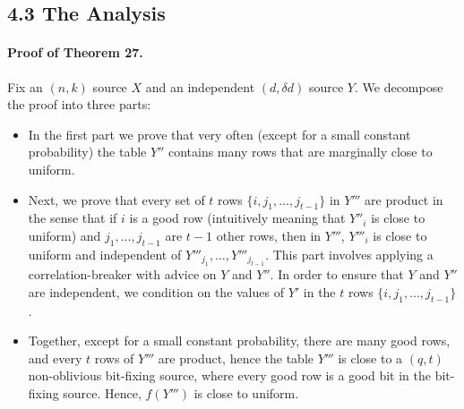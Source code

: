 \subsection*{4.3 The Analysis}
\paragraph{Proof of Theorem 27.} Fix an $(n,k)$ source $X$ and an independent $(d,\delta d)$ source $Y$. We decompose the proof into three parts:
\begin{itemize}
\item In the first part we prove that very often (except for a small constant probability) the table $Y''$ contains many rows that are marginally close to uniform.
\item Next, we prove that every set of $t$ rows $\{i,j_1,\ldots,j_{t-1}\}$ in $Y'''$ are product in the sense that if $i$ is a good row (intuitively meaning that $Y''_i$ is close to uniform) and $j_1,\ldots,j_{t-1}$ are $t-1$ other rows, then in $Y'''$, $Y'''_i$ is close to uniform and independent of $Y'''_{j_1},\ldots,Y'''_{j_{t-1}}$. This part involves applying a correlation-breaker with advice on $Y$ and $Y''$. In order to ensure that $Y$ and $Y''$ are independent, we condition on the values of $Y'$ in the $t$ rows $\{i,j_1,\ldots,j_{t-1}\}$.
\item Together, except for a small constant probability, there are many good rows, and every $t$ rows of $Y'''$ are product, hence the table $Y'''$ is close to a $(q,t)$ non-oblivious bit-fixing source, where every good row is a good bit in the bit-fixing source. Hence, $f(Y''')$ is close to uniform.
\end{itemize}
